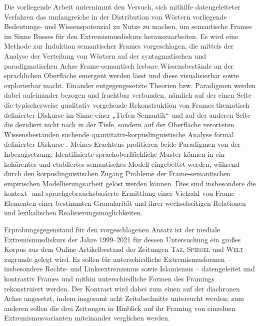 Die vorliegende Arbeit unternimmt den Versuch, sich mithilfe datengeleiteter Verfahren das umfangreiche in der Distribution von Wörtern vorliegende Bedeutungs- und Wissenspotenzial zu Nutze zu machen, um semantische Frames im Sinne Busses \autocite*{busseFrameSemantikKompendium2012} für den Extremismusdiskurs herauszuarbeiten. Es wird eine Methode zur Induktion semantischer Frames vorgeschlagen, die mittels der Analyse der Verteilung von Wörtern auf der syntagmatischen und paradigmatischen Achse Frame-semantisch lesbare Wissensbestände an der sprachlichen Oberfläche emergent werden lässt und diese visualisierbar sowie explorierbar macht. Einander entgegengesetzte Theorien bzw. Paradigmen werden dabei aufeinander bezogen und fruchtbar verbunden, nämlich auf der einen Seite die typischerweise qualitativ vorgehende Rekonstruktion von Frames thematisch definierter Diskurse im Sinne einer „Tiefen-Semantik`` \autocite[148]{busseDiskursSpracheGesellschaftliches2013} und auf der anderen Seite die dezidiert nicht nach in der Tiefe, sondern auf der Oberfläche verorteten Wissensbeständen suchende quantitativ-korpuslinguistische Analyse formal definierter Diskurse \autocite{bubenhoferSprachgebrauchsmusterKorpuslinguistikAls2009, scharlothWuchernRhizomeLinguistische2013}. Meines Erachtens profitieren beide Paradigmen von der Inbezugsetzung: Identifizierte sprachoberflächliche Muster können in ein kohärentes und etabliertes semantisches Modell eingebettet werden, während durch den korpuslinguistischen Zugang Probleme der Frame-semantischen empirischen Modellierungsarbeit gelöst werden können. Dies sind insbesondere die kontext- und sprachgebrauchsbasierte Ermittlung einer Vielzahl von Frame-Elementen einer bestimmten Granularität und ihrer wechselseitigen Relationen und lexikalischen Realisierungsmöglichkeiten.

Erprobungsgegenstand für den vorgeschlagenen Ansatz ist der mediale Extremismusdiskurs der Jahre 1999--2021 für dessen Untersuchung ein großes Korpus aus dem Online-Artikelbestand der Zeitungen \textsc{Taz}, \textsc{Spiegel} und \textsc{Welt} zugrunde gelegt wird. Es sollen für unterschiedliche Extremismusformen -- insbesondere Rechts- und Linksextremismus sowie Islamismus -- datengeleitet und kontrastiv Frames und mithin unterschiedliche Formen des Framings rekonstruiert werden. Der Kontrast wird dabei zum einen auf der diachronen Achse angesetzt, indem insgesamt acht Zeitabschnitte untersucht werden; zum anderen sollen die drei Zeitungen in Hinblick auf ihr Framing von einzelnen Extremismusvarianten miteinander verglichen werden.

